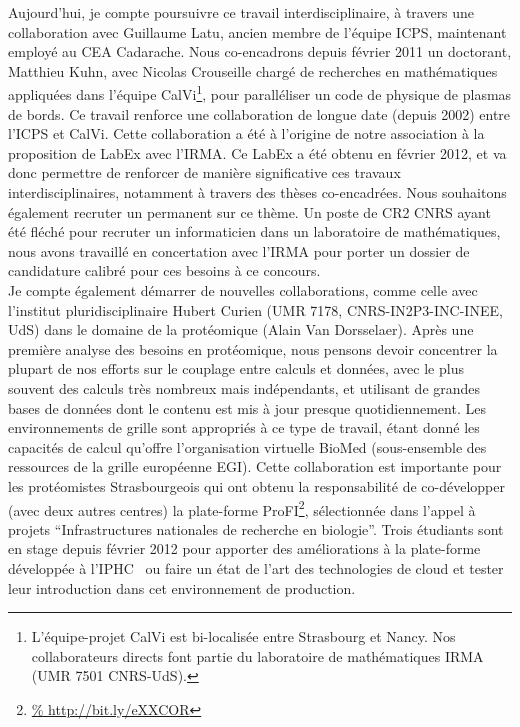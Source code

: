 \documentclass[11pt]{article}
\begin{document}
Aujourd'hui, je compte poursuivre ce travail interdisciplinaire, à travers 
une collaboration avec Guillaume Latu, ancien membre de l'équipe ICPS, 
maintenant employé au CEA Cadarache. Nous co-encadrons depuis février 2011 un 
doctorant, Matthieu Kuhn, avec Nicolas Crouseille chargé de recherches en 
mathématiques appliquées dans l'équipe CalVi\footnote{L'équipe-projet CalVi
est bi-localisée entre Strasbourg et Nancy.  Nos collaborateurs directs font 
partie du laboratoire de mathématiques IRMA (UMR 7501 CNRS-UdS).}, pour 
paralléliser un code de physique de plasmas de bords. Ce travail renforce une 
collaboration de longue date (depuis 2002) entre l'ICPS et CalVi. Cette 
collaboration a été à l'origine de notre association à la proposition de LabEx 
avec l'IRMA. Ce LabEx a été obtenu en février 2012, et va donc permettre de 
renforcer de manière significative ces travaux interdisciplinaires, notamment 
à travers des thèses co-encadrées. Nous souhaitons également recruter un 
permanent sur ce thème. Un poste de CR2 CNRS ayant été fléché pour recruter
un informaticien dans un laboratoire de mathématiques, nous avons travaillé
en concertation avec l'IRMA pour porter un dossier de candidature calibré 
pour ces besoins à ce concours.\\  


Je compte également démarrer de nouvelles collaborations, comme celle avec 
l'institut pluridisciplinaire Hubert Curien (UMR 7178, CNRS-IN2P3-INC-INEE, UdS) 
dans le domaine de la protéomique (Alain Van Dorsselaer). Après une première 
analyse des besoins en protéomique, nous pensons devoir concentrer la plupart 
de nos efforts sur le couplage entre calculs et données, avec le plus souvent 
des calculs très nombreux mais indépendants, et utilisant de grandes bases de 
données dont le contenu est mis à jour presque quotidiennement. Les 
environnements de grille sont appropriés à ce type de travail, étant donné les
capacités de calcul qu'offre l'organisation virtuelle BioMed (sous-ensemble
des ressources de la grille européenne EGI). Cette collaboration est importante
pour les protéomistes Strasbourgeois qui ont obtenu la responsabilité de
co-développer (avec deux autres centres) la plate-forme ProFI\footnote{\url{%
http://bit.ly/eXXCOR}}, sélectionnée dans l'appel à projets ``Infrastructures 
nationales de recherche en  biologie''. Trois étudiants sont en stage depuis
février 2012 pour apporter des améliorations à la plate-forme développée à
l'IPHC~\cite{iphc-2011} ou faire un état de l'art des technologies de cloud
et tester leur introduction dans cet environnement de production.
 
\end{document}
